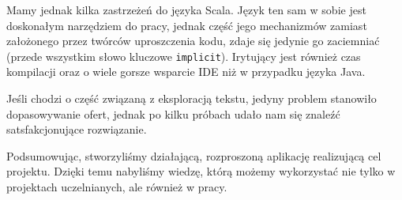 \documentclass[a4paper,12pt]{mwart}
\begin{document}
Mamy jednak kilka zastrzeżeń do języka Scala. Język ten sam w sobie
jest doskonałym narzędziem do pracy, jednak część jego mechanizmów zamiast
założonego przez twórców uproszczenia kodu, zdaje się jedynie go zaciemniać
(przede wszystkim słowo kluczowe \verb+implicit+).
Irytujący jest również czas kompilacji oraz o wiele gorsze wsparcie IDE niż
w przypadku języka Java.

Jeśli chodzi o część związaną z eksploracją tekstu, jedyny problem stanowiło
dopasowywanie ofert, jednak po kilku próbach udało nam się znaleźć
satsfakcjonujące rozwiązanie.

Podsumowując, stworzyliśmy działającą, rozproszoną aplikację
realizującą cel projektu. Dzięki temu nabyliśmy wiedzę, którą możemy wykorzystać
nie tylko w projektach uczelnianych, ale również w pracy.
\end{document}
